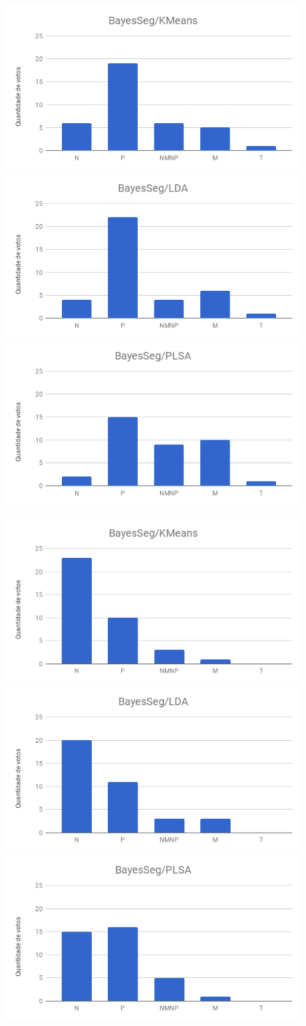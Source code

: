 \begin{figure}[!h] \centering     %

		\includegraphics[width=.31\textwidth]{images/figuras-experimento/t1q3.png}
		\includegraphics[width=.31\textwidth]{images/figuras-experimento/t2q3.png}
		\includegraphics[width=.31\textwidth]{images/figuras-experimento/t3q3.png}

	\label{fig:influenciaExtSegQ3}
\end{figure}


\begin{figure}[!h] \centering     %

		\includegraphics[width=.31\textwidth]{images/figuras-experimento/t1q4.png}
		\includegraphics[width=.31\textwidth]{images/figuras-experimento/t2q4.png}
		\includegraphics[width=.31\textwidth]{images/figuras-experimento/t3q4.png}

	\label{fig:influenciaExtSegQ4}
\end{figure}






